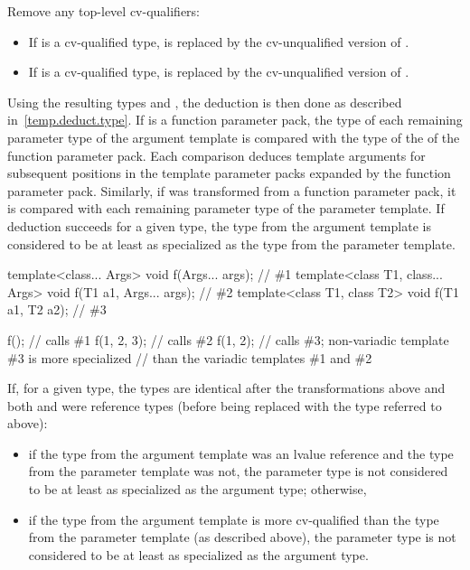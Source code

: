 \pnum
Remove any top-level cv-qualifiers:
\begin{itemize}
\item
If
is a cv-qualified type,
is replaced by the cv-unqualified version of
.
\item
If
is a cv-qualified type,
is replaced by the cv-unqualified version of
.
\end{itemize}

\pnum
Using the resulting types
and
,
the deduction is then done as described in~\ref{temp.deduct.type}.
If  is a function parameter pack, the type  of each remaining
parameter type of the argument template is compared with the type  of
the  of the function parameter pack. Each comparison
deduces template arguments for subsequent positions in the template parameter
packs expanded by the function parameter pack.
Similarly, if  was transformed from a function parameter pack,
it is compared with each remaining parameter type of the parameter template.
If deduction succeeds for a given type,
the type from the argument template is considered to be at least as specialized
as the type from the parameter template.
\begin{example}
\begin{codeblock}
template<class... Args>           void f(Args... args);         // \#1
template<class T1, class... Args> void f(T1 a1, Args... args);  // \#2
template<class T1, class T2>      void f(T1 a1, T2 a2);         // \#3

f();                // calls \#1
f(1, 2, 3);         // calls \#2
f(1, 2);            // calls \#3; non-variadic template \#3 is more specialized
                    // than the variadic templates \#1 and \#2
\end{codeblock}
\end{example}

\pnum
If, for a given type, the
types are identical after the transformations above
and both  and  were reference types (before being replaced with the
type referred to above):

\begin{itemize}
\item if the type from the argument template was an lvalue reference and the type
from the parameter template was not,
the parameter type is not considered to be
at least as specialized as the argument type; otherwise,

\item if the type from
the argument template is more cv-qualified than the type from the
parameter template (as described above),
the parameter type is not considered to be
at least as specialized as the argument type.
\end{itemize}


